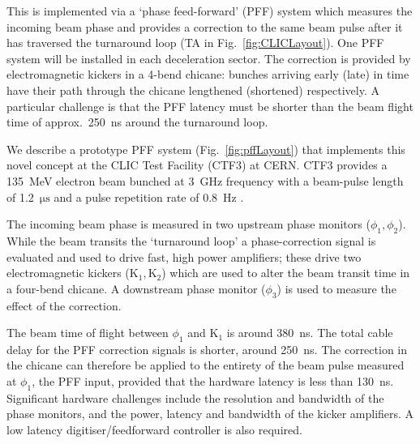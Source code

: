 \documentclass[%
 reprint,
 superscriptaddress,
 amsmath,
 amssymb,
 prl,
]{revtex4-1}
\begin{document}
This is implemented via a `phase feed-forward' (PFF) system which measures the 
incoming beam phase and provides a correction to the same beam pulse 
after it has traversed the turnaround loop (TA in Fig.~\ref{fig:CLICLayout}). 
One PFF system will be installed in each deceleration sector. The correction 
is provided by electromagnetic kickers in a 4-bend chicane: bunches arriving 
early (late) in time have their path through the chicane lengthened (shortened) 
respectively. A particular challenge is that the PFF latency must be shorter 
than the beam flight time of approx.~250~ns around the turnaround loop.

We describe a prototype PFF system (Fig.~\ref{fig:pffLayout}) that implements 
this novel concept at the CLIC Test Facility (CTF3) at CERN. CTF3 provides a 
135~MeV electron beam bunched at 3~GHz frequency with a beam-pulse length of 
1.2~\(\mathrm{\mu s}\) and a pulse repetition rate of 0.8~Hz \cite{CLICCDR}. 

The incoming beam phase is measured in two upstream phase 
monitors (\(\phi_{1}, \phi_{2}\)). While the beam 
transits the ‘turnaround loop’ a phase-correction signal is evaluated and used 
to drive fast, high power amplifiers; these drive two electromagnetic kickers 
(\(\mathrm{K_1, K_2}\)) which are used to alter the beam transit time in a 
four-bend chicane. A downstream phase monitor (\(\phi_{3}\)) is 
used to measure the effect of the correction. 

The beam time of flight between \(\phi_1\) and \(\mathrm{K_1}\) is around 
380~ns. The total cable delay for the PFF correction signals 
is shorter, around 250~ns. The correction in the chicane can therefore be 
applied to the entirety of the beam pulse measured at \(\phi_1\), the PFF 
input, provided that the hardware latency is less than 130~ns. Significant 
hardware challenges include the resolution and bandwidth of the phase monitors, 
and the power, latency and bandwidth of the kicker amplifiers. A low latency 
digitiser/feedforward controller is also required.
 
\end{document}

